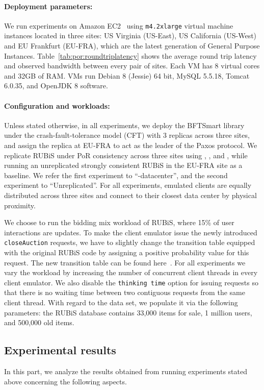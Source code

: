 \paragraph{Deployment parameters:}
We run experiments on Amazon EC2~\cite{AmazonEC2} using {\tt m4.2xlarge} virtual machine instances
located in three sites: US Virginia (US-East), US California (US-West) and EU Frankfurt (EU-FRA), which
are the latest generation of General Purpose Instances. Table~\ref{tab:por:roundtriplatency} shows the 
average round trip latency and observed bandwidth between every pair of sites. Each VM has 8 virtual cores 
and 32GB of RAM. VMs run Debian 8 (Jessie) 64 bit, MySQL 5.5.18, Tomcat 6.0.35, and OpenJDK 8 software. 

\paragraph{Configuration and workloads:}
Unless stated otherwise, in all experiments, we deploy the BFTSmart library under the crash-fault-tolerance
model (CFT) with 3 replicas across three sites, and assign the replica at EU-FRA to act as the leader of the Paxos protocol. 
We replicate RUBiS under PoR consistency across three sites using \coordtool, \tool, and \Gemini,
while running an unreplicated strongly consistent RUBiS in the EU-FRA site as a baseline. We refer
the first experiment to ``-datacenter'', and the second experiment to ``Unreplicated''.
For all experiments, emulated clients are equally distributed across three sites and connect
to their closest data center by physical proximity. 

We choose to run the bidding mix workload of RUBiS, where 15\% of user interactions 
are updates. To make the client emulator issue the newly introduced {\tt closeAuction}
requests, we have to slightly change the transition table equipped with the original RUBiS code
by assigning a positive probability value for this request. The new transition table can be found here~\cite{OlisipoTranstionTable}.
For all experiments we vary the workload by increasing the number of concurrent client threads in every client emulator.
We also disable the {\tt thinking time} option for issuing requests so that
there is no waiting time between two contiguous requests from the same client thread.
With regard to the data set, we populate it via the following parameters: the RUBiS database contains 33,000 items for sale, 1 million
users, and 500,000 old items.

\subsection{Experimental results}
In this part, we analyze the results obtained from running experiments stated above concerning
the following aspects.
